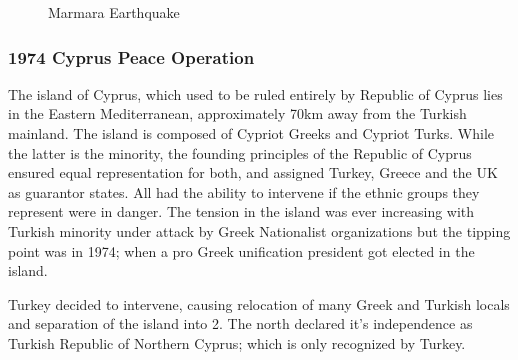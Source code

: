 \documentclass[12pt]{article}
\begin{document}
\begin{figure}[h]%
    \centering
    \qquad
    \caption{Marmara Earthquake}%
    \label{fig:example}%
\end{figure}



\subsubsection{1974 Cyprus Peace Operation}

The island of Cyprus, which used to be ruled entirely by Republic of Cyprus lies in the Eastern Mediterranean, approximately 70km away from the Turkish mainland. The island is composed of Cypriot Greeks and Cypriot Turks. While the latter is the minority, the founding principles of the Republic of Cyprus ensured equal representation for both, and assigned Turkey, Greece and the UK as guarantor states. All had the ability to intervene if the ethnic groups they represent were in danger. The tension in the island was ever increasing with Turkish minority under attack by Greek Nationalist organizations but the tipping point was in 1974; when a pro Greek unification president got elected in the island. 

Turkey decided to intervene, causing relocation of many Greek and Turkish locals and separation of the island into 2. The north declared it's independence as Turkish Republic of Northern Cyprus; which is only recognized by Turkey. 
\end{document}
